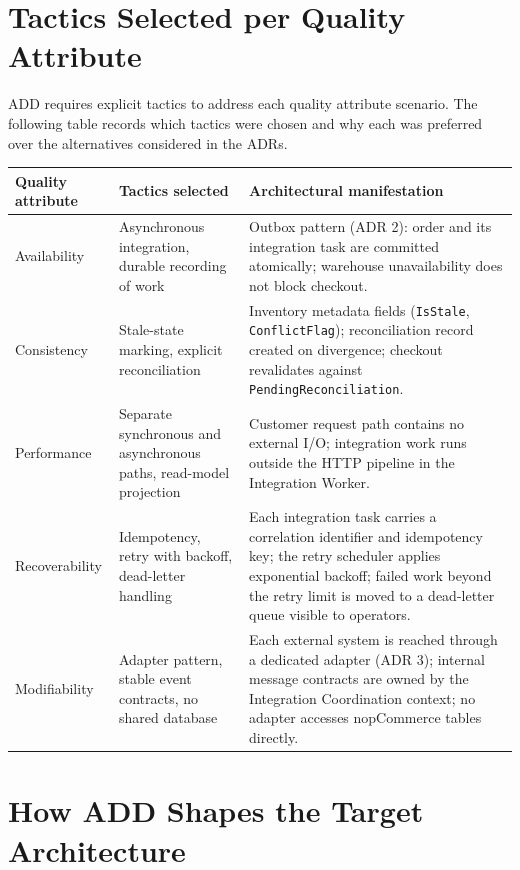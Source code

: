 \section{Tactics Selected per Quality Attribute}

ADD requires explicit tactics to address each quality attribute scenario. The following table
records which tactics were chosen and why each was preferred over the alternatives
considered in the ADRs.

\begingroup
\small
\setlength{\tabcolsep}{4pt}
\renewcommand{\arraystretch}{1.15}
\begin{center}
\begin{tabular}{|p{}|p{}|p{}|}
\hline
\textbf{Quality attribute} & \textbf{Tactics selected} & \textbf{Architectural manifestation} \\
\hline
Availability & Asynchronous integration, durable recording of work & Outbox pattern (ADR 2): order and its integration task are committed atomically; warehouse unavailability does not block checkout. \\
\hline
Consistency & Stale-state marking, explicit reconciliation & Inventory metadata fields (\texttt{IsStale}, \texttt{ConflictFlag}); reconciliation record created on divergence; checkout revalidates against \texttt{PendingReconciliation}. \\
\hline
Performance & Separate synchronous and asynchronous paths, read-model projection & Customer request path contains no external I/O; integration work runs outside the HTTP pipeline in the Integration Worker. \\
\hline
Recoverability & Idempotency, retry with backoff, dead-letter handling & Each integration task carries a correlation identifier and idempotency key; the retry scheduler applies exponential backoff; failed work beyond the retry limit is moved to a dead-letter queue visible to operators. \\
\hline
Modifiability & Adapter pattern, stable event contracts, no shared database & Each external system is reached through a dedicated adapter (ADR 3); internal message contracts are owned by the Integration Coordination context; no adapter accesses nopCommerce tables directly. \\
\hline
\end{tabular}
\end{center}
\endgroup

\section{How ADD Shapes the Target Architecture}

